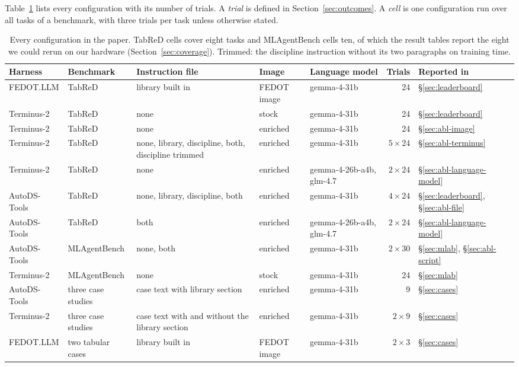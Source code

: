 Table~\ref{tab:arms} lists every configuration with its number of trials.
A \emph{trial} is defined in Section~\ref{sec:outcomes}. A \emph{cell} is
one configuration run over all tasks of a benchmark, with three trials per
task unless otherwise stated.

\begin{table}[t]
\centering
\caption{Every configuration in the paper. TabReD cells cover eight tasks
and MLAgentBench cells ten, of which the result tables report the eight we
could rerun on our hardware (Section~\ref{sec:coverage}). Trimmed: the
discipline instruction without its two paragraphs on training time.}
\label{tab:arms}
\footnotesize
\setlength{\tabcolsep}{4pt}
\begin{tabular}{@{}ll>{\raggedright\arraybackslash}p{4.3cm}llrl@{}}
\toprule
Harness & Benchmark & Instruction file & Image & Language model & Trials & Reported in \\
\midrule
FEDOT.LLM    & TabReD & library built in & FEDOT image & gemma-4-31b & 24 & \S\ref{sec:leaderboard} \\
Terminus-2   & TabReD & none & stock & gemma-4-31b & 24 & \S\ref{sec:leaderboard} \\
Terminus-2   & TabReD & none & enriched & gemma-4-31b & 24 & \S\ref{sec:abl-image} \\
Terminus-2   & TabReD & none, library, discipline, both, discipline trimmed & enriched & gemma-4-31b & $5\times24$ & \S\ref{sec:abl-terminus} \\
Terminus-2   & TabReD & none & enriched & gemma-4-26b-a4b, glm-4.7 & $2\times24$ & \S\ref{sec:abl-language-model} \\
AutoDS-Tools & TabReD & none, library, discipline, both & enriched & gemma-4-31b & $4\times24$ & \S\ref{sec:leaderboard}, \S\ref{sec:abl-file} \\
AutoDS-Tools & TabReD & both & enriched & gemma-4-26b-a4b, glm-4.7 & $2\times24$ & \S\ref{sec:abl-language-model} \\
\midrule
AutoDS-Tools & MLAgentBench & none, both & enriched & gemma-4-31b & $2\times30$ & \S\ref{sec:mlab}, \S\ref{sec:abl-script} \\
Terminus-2   & MLAgentBench & none & stock & gemma-4-31b & 24 & \S\ref{sec:mlab} \\
\midrule
AutoDS-Tools & three case studies & case text with library section & enriched & gemma-4-31b & 9 & \S\ref{sec:cases} \\
Terminus-2   & three case studies & case text with and without the library section & enriched & gemma-4-31b & $2\times9$ & \S\ref{sec:cases} \\
FEDOT.LLM    & two tabular cases & library built in & FEDOT image & gemma-4-31b & $2\times3$ & \S\ref{sec:cases} \\
\bottomrule
\end{tabular}
\end{table}

